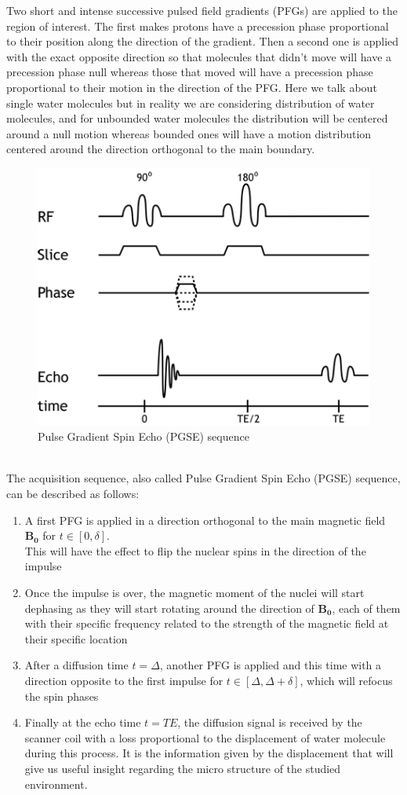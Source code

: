 Two short and intense successive pulsed field gradients (PFGs) are applied to the region of interest. The first makes protons have a precession phase proportional to their position along the direction of the gradient. Then a second one is applied with the exact opposite direction so that molecules that didn't move will have a precession phase null whereas those that moved will have a precession phase proportional to their motion in the direction of the PFG. Here we talk about single water molecules but in reality we are considering distribution of water molecules, and for unbounded water molecules the distribution will be centered around a null motion whereas bounded ones will have a motion distribution centered around the direction orthogonal to the main boundary.\\
\begin{figure}[h!]
    \centering
    \includegraphics[width=.5\textwidth]{figures/pgse}
    \caption{Pulse Gradient Spin Echo (PGSE) sequence}
    \label{fig:pgse}
\end{figure}
\\
The acquisition sequence, also called Pulse Gradient Spin Echo (PGSE) sequence, can be described as follows: \cite{assemlal2011recent}
\begin{enumerate}
    \item A first PFG is applied in a direction orthogonal to the main magnetic field $\mathbf{B_0}$ for $t \in [0, \delta]$.\\
    This will have the effect to flip the nuclear spins in the direction of the impulse
    \item Once the impulse is over, the magnetic moment of the nuclei will start dephasing as they will start rotating around the direction of $\mathbf{B_0}$, each of them with their specific frequency related to the strength of the magnetic field at their specific location
    \item After a diffusion time $t = \Delta$, another PFG is applied and this time with a direction opposite to the first impulse for $t \in [\Delta, \Delta + \delta]$, which will refocus the spin phases
    \item Finally at the echo time $t = TE$, the diffusion signal is received by the scanner coil with a loss proportional to the displacement of water molecule during this process. It is the information given by the displacement that will give us useful insight regarding the micro structure of the studied environment.
\end{enumerate}


